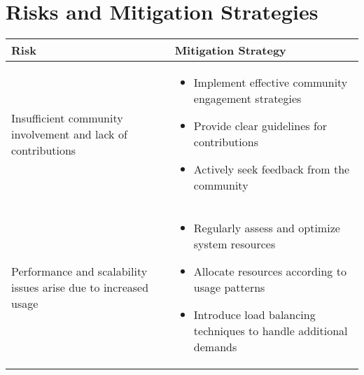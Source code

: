 
\chapter{Risks and Mitigation Strategies} %

\label{Chapter3} %




\begin{center}
   \begin{tabular}{|p{}|p{}|}
      \hline
      Risk                                                            & Mitigation Strategy \\
      \hline\hline
      Insufficient community involvement and lack of contributions    &
      \begin{itemize}
         \item Implement effective community engagement strategies
         \item Provide clear guidelines for contributions
         \item Actively seek feedback from the community
      \end{itemize}                                                             \\ \hline

      Performance and scalability issues arise due to increased usage &
      \begin{itemize}
         \item Regularly assess and optimize system resources
         \item Allocate resources according to usage patterns
         \item Introduce load balancing techniques to handle additional demands
      \end{itemize}                                                             \\ \hline
   \end{tabular}
\end{center}